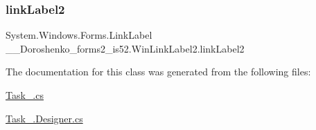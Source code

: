 \subsubsection{\texorpdfstring{link\+Label2}{linkLabel2}}
{\footnotesize\ttfamily System.\+Windows.\+Forms.\+Link\+Label \+\_\+\_\+\+Doroshenko\+\_\+forms2\+\_\+is52.\+Win\+Link\+Label2.\+link\+Label2\hspace{0.3cm}{\ttfamily [private]}}



The documentation for this class was generated from the following files\+:\begin{DoxyCompactItemize}
\item 
\hyperlink{_task__7_8cs}{Task\+\_.\+cs}\item 
\hyperlink{_task__7_8_designer_8cs}{Task\+\_.\+Designer.\+cs}\end{DoxyCompactItemize}
